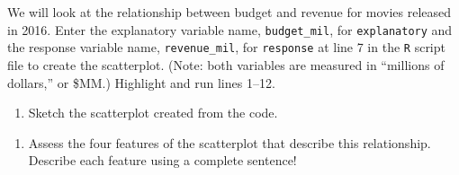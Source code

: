 \documentclass[
]{report}
\newenvironment{Shaded}{\begin{snugshade}}{\end{snugshade}}
\newcommand{\AttributeTok}[1]{\textcolor[rgb]{0.77,0.63,0.00}{#1}}
\newcommand{\CommentTok}[1]{\textcolor[rgb]{0.56,0.35,0.01}{\textit{#1}}}
\newcommand{\ConstantTok}[1]{\textcolor[rgb]{0.00,0.00,0.00}{#1}}
\newcommand{\FunctionTok}[1]{\textcolor[rgb]{0.00,0.00,0.00}{#1}}
\newcommand{\NormalTok}[1]{#1}
\newcommand{\SpecialCharTok}[1]{\textcolor[rgb]{0.00,0.00,0.00}{#1}}
\newcommand{\StringTok}[1]{\textcolor[rgb]{0.31,0.60,0.02}{#1}}
\providecommand{\tightlist}{%
  \setlength{\itemsep}{0pt}\setlength{\parskip}{0pt}}
\begin{document}
\vspace{0.4in}

We will look at the relationship between budget and revenue for movies released in 2016. Enter the explanatory variable name, \texttt{budget\_mil}, for \texttt{explanatory} and the response variable name, \texttt{revenue\_mil}, for \texttt{response} at line 7 in the \texttt{R} script file to create the scatterplot. (Note: both variables are measured in ``millions of dollars,'' or \$MM.) Highlight and run lines 1--12.

\begin{Shaded}
\end{Shaded}

\begin{enumerate}
\def\labelenumi{\arabic{enumi}.}
\setcounter{enumi}{2}
\tightlist
\item
  Sketch the scatterplot created from the code.
\end{enumerate}

\vspace{2in}

\begin{enumerate}
\def\labelenumi{\arabic{enumi}.}
\setcounter{enumi}{3}
\tightlist
\item
  Assess the four features of the scatterplot that describe this relationship. Describe each feature using a complete sentence!
\end{enumerate}
\end{document}
